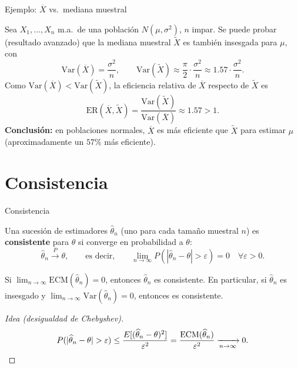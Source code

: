 \documentclass[aspectratio=169,11pt]{beamer}
\begin{document}
\begin{frame}{Ejemplo: $\overline{X}$ vs.\ mediana muestral}
\begin{example}
Sea $X_1,\dots,X_n$ m.a.\ de una población $N(\mu,\sigma^2)$, $n$ impar. Se puede probar (resultado avanzado) que la mediana muestral $\widetilde X$ es también insesgada para $\mu$, con
\[
\mathrm{Var}(\overline X) = \frac{\sigma^2}{n}, \qquad \mathrm{Var}(\widetilde X) \approx \frac{\pi}{2}\cdot\frac{\sigma^2}{n} \approx 1.57\cdot \frac{\sigma^2}{n}.
\]
Como $\mathrm{Var}(\overline X) < \mathrm{Var}(\widetilde X)$, la eficiencia relativa de $\overline X$ respecto de $\widetilde X$ es
\[
\mathrm{ER}(\overline X, \widetilde X) = \frac{\mathrm{Var}(\widetilde X)}{\mathrm{Var}(\overline X)} \approx 1.57 > 1.
\]
\textbf{Conclusión:} en poblaciones normales, $\overline X$ es más eficiente que $\widetilde X$ para estimar $\mu$ (aproximadamente un $57\%$ más eficiente).
\end{example}
\end{frame}

\section{Consistencia}

\begin{frame}{Consistencia}
\begin{definition}
Una sucesión de estimadores $\widehat\theta_n$ (uno para cada tamaño muestral $n$) es \textbf{consistente} para $\theta$ si converge en probabilidad a $\theta$:
\[
\widehat\theta_n \xrightarrow{P} \theta, \qquad \text{es decir,} \qquad \lim_{n\to\infty} P\left(|\widehat\theta_n - \theta| > \varepsilon\right) = 0 \quad \forall \varepsilon>0.
\]
\end{definition}

\begin{theorem}
Si $\lim_{n\to\infty} \mathrm{ECM}(\widehat\theta_n) = 0$, entonces $\widehat\theta_n$ es consistente. En particular, si $\widehat\theta_n$ es insesgado y $\lim_{n\to\infty}\mathrm{Var}(\widehat\theta_n)=0$, entonces es consistente.
\end{theorem}

\begin{proof}[Idea (desigualdad de Chebyshev)]
\[
P(|\widehat\theta_n-\theta|>\varepsilon) \le \frac{E[(\widehat\theta_n-\theta)^2]}{\varepsilon^2} = \frac{\mathrm{ECM}(\widehat\theta_n)}{\varepsilon^2} \xrightarrow[n\to\infty]{} 0. \qedhere
\]
\end{proof}
\end{frame}
\end{document}
